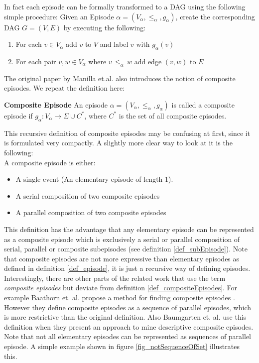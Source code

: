In fact each episode can be formally transformed to a DAG using the following simple procedure: Given an Episode $\alpha = (V_\alpha,{\leq}_{\alpha},g_\alpha)$, create the corresponding DAG $G = (V,E)$ by executing the following:

\begin{enumerate}
	\item For each $v \in V_\alpha$ add $v$ to $V$ and label $v$ with $g_\alpha (v)$
	\item For each pair $v,w \in V_\alpha$ where $v \, {\leq}_{\alpha} \, w $ add edge $(v,w)$ to $E$
\end{enumerate}

The original paper by Manilla et.al. \cite{mannila1995discovering} also introduces the notion of composite episodes. We repeat the definition here:

\begin{mydef}
\label{def_compositeEpisodes}
\textbf{Composite Episode} An episode $\alpha = (V_\alpha,{\leq}_{\alpha},g_\alpha)$ is called a composite episode if $g_\alpha : V_\alpha \rightarrow \Sigma \cup C^*$, where $C^*$ is the set of all composite episodes. \cite{mannila1995discovering}
\end{mydef}

This recursive definition of composite episodes may be confusing at first, since it is formulated very compactly. A slightly more clear way to look at it is the following:\\
A composite episode is either:
\begin{itemize}
	\item A single event (An elementary episode of length 1).
	\item A serial composition of two composite episodes
	\item A parallel composition of two composite episodes
\end{itemize}

This definition has the advantage that any elementary episode can be represented as a composite episode which is exclusively a serial or parallel composition of serial, parallel or composite subepisodes (see definition \ref{def_subEpisode}). Note that composite episodes are not more expressive than elementary episodes as defined in definition \ref{def_episode}, it is just a recursive way of defining episodes. \\
Interestingly, there are other parts of the related work that use the term \textit{composite episodes} but deviate from definition \ref{def_compositeEpisodes}. For example Baathorn et. al. propose a method for finding composite episodes \cite{bathoorn2007finding}. However they define composite episodes as a sequence of parallel episodes, which is more restrictive than the original definition. Also Baumgarten et. al. use this definition \cite{baumgarten2003tree} when they present an approach to mine descriptive composite episodes. Note that not all elementary episodes can be represented as sequences of parallel episode. A simple example shown in figure \ref{fig_notSequenceOfSet} illustrates this.

